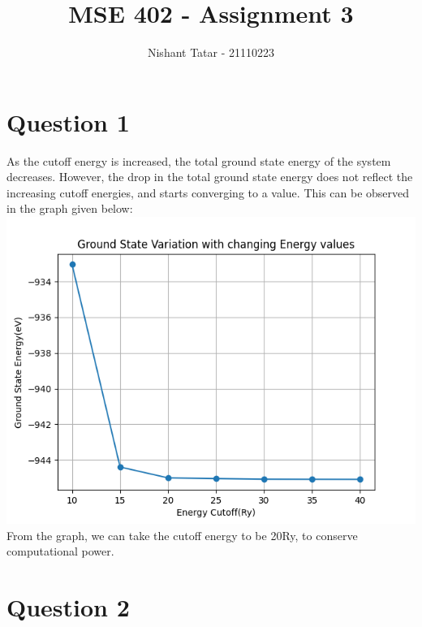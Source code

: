 \documentclass[11pt]{article}
\title{MSE 402 - Assignment 3}
\date{}
\author{Nishant Tatar - 21110223}
\begin{document}
\maketitle

\section{Question 1}
As the cutoff energy is increased, the total ground state energy of the system decreases. However, the drop in the total ground state energy does not reflect the increasing cutoff energies, and starts converging to a value. This can be observed in the graph given below:\\
\includegraphics[scale=0.5]{Q1.png}\\
From the graph, we can take the cutoff energy to be 20Ry, to conserve computational power.

\section{Question 2}
\end{document}
